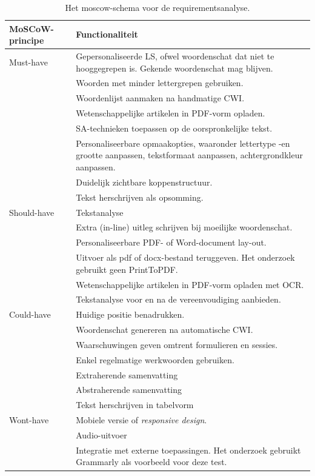 \begin{center}
	\begin{table}[H]
		\begin{tabular}{ | m{2cm} | m{13cm} | } 
			\hline
			\textbf{MoSCoW-principe} & \textbf{Functionaliteit} \\
			\hline
			Must-have & Gepersonaliseerde LS, ofwel woordenschat dat niet te hooggegrepen is. Gekende woordenschat mag blijven. \\
			& Woorden met minder lettergrepen gebruiken. \\
			& Woordenlijst aanmaken na handmatige CWI. \\
			& Wetenschappelijke artikelen in PDF-vorm opladen. \\
			& SA-technieken toepassen op de oorspronkelijke tekst. \\
			& Personaliseerbare opmaakopties, waaronder lettertype -en grootte aanpassen, tekstformaat aanpassen, achtergrondkleur aanpassen. \\
			& Duidelijk zichtbare koppenstructuur. \\
			& Tekst herschrijven als opsomming. \\
			\hline
			Should-have & Tekstanalyse \\
			& Extra (in-line) uitleg schrijven bij moeilijke woordenschat. \\
			& Personaliseerbare PDF- of Word-document lay-out. \\
			& Uitvoer als pdf of docx-bestand teruggeven. Het onderzoek gebruikt geen PrintToPDF. \\
			& Wetenschappelijke artikelen in PDF-vorm opladen met OCR. \\
			& Tekstanalyse voor en na de vereenvoudiging aanbieden. \\
			\hline
			Could-have & Huidige positie benadrukken.\\
			& Woordenschat genereren na automatische CWI. \\
			& Waarschuwingen geven omtrent formulieren en sessies. \\
			& Enkel regelmatige werkwoorden gebruiken. \\
			& Extraherende samenvatting \\
			& Abstraherende samenvatting \\
			& Tekst herschrijven in tabelvorm \\
			\hline
			Wont-have & Mobiele versie of \textit{responsive design}. \\
			& Audio-uitvoer \\
			& Integratie met externe toepassingen. Het onderzoek gebruikt Grammarly als voorbeeld voor deze test. \\
			\hline
		\end{tabular}
		\caption{Het moscow-schema voor de requirementsanalyse.}
		\label{img:moscow-table}
	\end{table}
\end{center}

